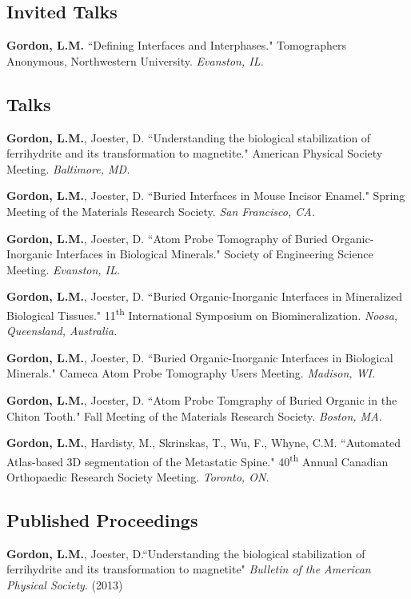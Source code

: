 \subsection*{Invited Talks}
\textbf{Gordon, L.M.} ``Defining Interfaces and Interphases." Tomographers Anonymous, Northwestern University. \emph{Evanston, IL.}

\subsection*{Talks}
\textbf{Gordon, L.M.}, Joester, D. ``Understanding the biological stabilization of ferrihydrite and its transformation to magnetite." American Physical Society Meeting. \emph{Baltimore, MD.}

\begingroup\setlength{\parskip}{0.15cm}
\textbf{Gordon, L.M.}, Joester, D. ``Buried Interfaces in Mouse Incisor Enamel." Spring Meeting of the Materials Research Society. \emph{San Francisco, CA.}

\textbf{Gordon, L.M.}, Joester, D. ``Atom Probe Tomography of Buried Organic-Inorganic Interfaces in Biological Minerals." Society of Engineering Science Meeting. \emph{Evanston, IL.}

\textbf{Gordon, L.M.}, Joester, D. ``Buried Organic-Inorganic Interfaces in Mineralized Biological Tissues." 11\textsuperscript{th} International Symposium on Biomineralization. \emph{Noosa, Queensland, Australia.}

\textbf{Gordon, L.M.}, Joester, D. ``Buried Organic-Inorganic Interfaces in Biological Minerals." Cameca Atom Probe Tomography Users Meeting. \emph{Madison, WI.}

\textbf{Gordon, L.M.}, Joester, D. ``Atom Probe Tomgraphy of Buried Organic in the Chiton Tooth." Fall Meeting of the Materials Research Society. \emph{Boston, MA.}

\textbf{Gordon, L.M.}, Hardisty, M., Skrinskas, T., Wu, F., Whyne, C.M. ``Automated Atlas-based 3D segmentation of the Metastatic Spine." 40\textsuperscript{th} Annual Canadian Orthopaedic Research Society Meeting. \emph{Toronto, ON.}
\endgroup

\subsection*{Published Proceedings}
\textbf{Gordon, L.M.}, Joester, D.``Understanding the biological stabilization of ferrihydrite and its transformation to magnetite" \emph{Bulletin of the American Physical Society}. (2013)

